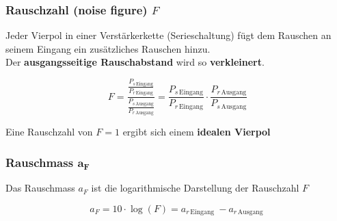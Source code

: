 \subsubsection{Rauschzahl (noise figure) $F$}

Jeder Vierpol in einer Verstärkerkette (Serieschaltung) fügt dem Rauschen an seinem Eingang ein zusätzliches Rauschen hinzu. \\
Der \textbf{ausgangsseitige Rauschabstand} wird so \textbf{verkleinert}.

$$ \boxed{ F = \frac{\frac{P_{s \,\text{Eingang}}}{P_{r \,\text{Eingang}}}}{\frac{P_{s \,\text{Ausgang}}}{P_{r \,\text{Ausgang}}}}
    = \frac{P_{s \,\text{Eingang}}}{P_{r \,\text{Eingang}}} \cdot \frac{P_{r \,\text{Ausgang}}}{P_{s \,\text{Ausgang}}} } $$

Eine Rauschzahl von $F = 1$ ergibt sich einem \textbf{idealen Vierpol}


\subsubsection{Rauschmass $\bm{a_F}$}

Das Rauschmass $a_F$ ist die logarithmische Darstellung der Rauschzahl $F$

$$ \boxed{ a_F = 10 \cdot \log(F) = a_{r \,{\text{Eingang }}} - a_{r \,{\text{Ausgang }} } } $$ 

